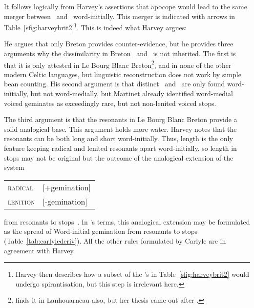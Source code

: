 It follows logically from Harvey's assertions that apocope would lead to the same merger between \lT\ and \xD\ word-initially. This merger is indicated with arrows in Table~\ref{sfig:harveybrit2}\footnote{Harvey then describes how a subset of the 's in Table~\ref{sfig:harveybrit2} would  undergo spirantisation, but this step is irrelevant here.}. This is indeed what Harvey argues:

He argues that only Breton provides counter-evidence, but he provides three arguments why the dissimilarity in Breton \lT\ and \xD\ is not inherited. The first is that it is only attested in Le Bourg Blanc Breton\footnote{\Textcite{carlyle_syllabic_1988} finds it in Lanhouarneau also, but her thesis came out after \textcite{harvey_aspects_1984}.}, and in none of the other modern Celtic languages, but linguistic reconstruction does not work by simple bean counting. His second argument is that distinct \lT\ and \xD\ are only found word-initially, but not word-medially, but Martinet already identified word-medial voiced geminates as exceedingly rare, but not non-lenited voiced stops.

The third argument is that the resonants in Le Bourg Blanc Breton provide a solid analogical base. This argument holds more water. Harvey notes that the resonants  can be both long and short word-initially. Thus, length is the only feature keeping radical and lenited resonants apart word-initially, so length in stops may not be original but the outcome of the analogical extension of the system
\begin{center}
  \begin{tabular}{l@{~=~}l}
    \textsc{radical}  & [+gemination]\\
    \textsc{lenition} & [-gemination]
  \end{tabular}
\end{center}
from resonants to stops~\autocite{harvey_aspects_1984}. In \textcite{carlyle_syllabic_1988}'s terms, this analogical extension may be formulated as the spread of Word-initial gemination from resonants to stops (Table~\ref{tab:carlylederiv}). All the other rules formulated by Carlyle are in agreement with Harvey.

